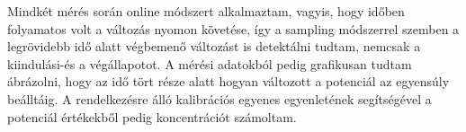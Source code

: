 Mindkét mérés során online módszert alkalmaztam, vagyis, hogy időben folyamatos volt a változás nyomon követése, így a sampling módszerrel szemben a legrövidebb idő alatt végbemenő változást is detektálni tudtam, nemcsak a kiindulási-és a végállapotot. A mérési adatokból pedig grafikusan tudtam ábrázolni, hogy az idő tört része alatt hogyan változott a potenciál az egyensúly beálltáig. A rendelkezésre álló kalibrációs egyenes egyenletének segítségével a potenciál értékekből pedig koncentrációt számoltam.  


